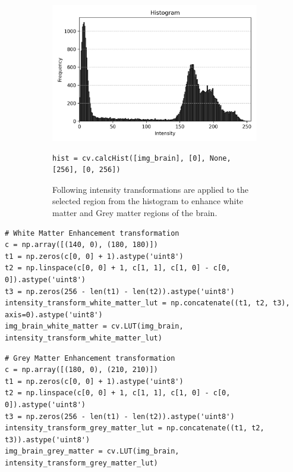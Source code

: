 \documentclass[11pt]{article}
\begin{document}
\begin{figure}[H]
    \centering
    \begin{subfigure}{0.48\textwidth}
        \includegraphics[width=\textwidth]{resources/Brain_hist.jpeg}
    \end{subfigure}
    \hfill
    \begin{subfigure}{0.48\textwidth}
        \begin{lstlisting}[style=pythonstyle]
hist = cv.calcHist([img_brain], [0], None, [256], [0, 256])
        \end{lstlisting}
        Following intensity transformations are applied to the selected region from the histogram to enhance white matter and Grey matter regions of the brain. 
        \vspace{3em}
    \end{subfigure}
\end{figure}

        \begin{lstlisting}[style=pythonstyle]
# White Matter Enhancement transformation
c = np.array([(140, 0), (180, 180)])
t1 = np.zeros(c[0, 0] + 1).astype('uint8')
t2 = np.linspace(c[0, 0] + 1, c[1, 1], c[1, 0] - c[0, 0]).astype('uint8')
t3 = np.zeros(256 - len(t1) - len(t2)).astype('uint8')
intensity_transform_white_matter_lut = np.concatenate((t1, t2, t3), axis=0).astype('uint8')
img_brain_white_matter = cv.LUT(img_brain, intensity_transform_white_matter_lut)
        \end{lstlisting}

        \begin{lstlisting}[style=pythonstyle]
# Grey Matter Enhancement transformation
c = np.array([(180, 0), (210, 210)])
t1 = np.zeros(c[0, 0] + 1).astype('uint8')
t2 = np.linspace(c[0, 0] + 1, c[1, 1], c[1, 0] - c[0, 0]).astype('uint8')
t3 = np.zeros(256 - len(t1) - len(t2)).astype('uint8')
intensity_transform_grey_matter_lut = np.concatenate((t1, t2, t3)).astype('uint8')
img_brain_grey_matter = cv.LUT(img_brain, intensity_transform_grey_matter_lut)
        \end{lstlisting}
\end{document}
